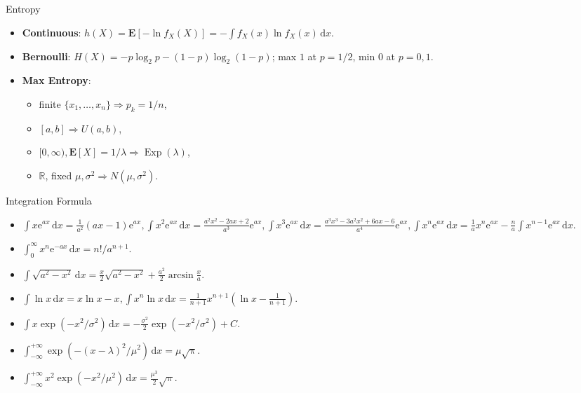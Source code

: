 \documentclass[landscape,a4paper]{article}
\newcommand{\e}{\mathrm{e}}
\newcommand{\EE}{\mathbf{E}}
\begin{document}
\begin{multicols*}{4}
\begin{card}{Entropy}
\begin{itemize}
				\item \textbf{Continuous}: $h(X)=\EE[-\ln f_X(X)]=-\int f_X(x)\ln f_X(x)\,\mathrm dx$.
				\item \textbf{Bernoulli}: $H(X)=-p\log_2p-(1-p)\log_2(1-p)$; max $1$ at $p=1/2$, min $0$ at $p=0,1$.
				\item \textbf{Max Entropy}:
				\begin{itemize}
					\item finite $\{x_1,\dots,x_n\}\Rightarrow p_k=1/n$,
					\item $[a,b]\Rightarrow U(a,b)$,
					\item $[0,\infty),\EE[X]=1/\lambda\Rightarrow \operatorname{Exp}(\lambda)$,
					\item $\mathbb R$, fixed $\mu,\sigma^2\Rightarrow N(\mu,\sigma^2)$.
				\end{itemize}
			\end{itemize}
		\end{card}
		\begin{card}{Integration Formula}
			\begin{itemize}
				\item $\int x\e^{ax}\,\mathrm dx=\frac{1}{a^2}(ax-1)\e^{ax},\int x^2\e^{ax}\,\mathrm dx=\frac{a^2x^2-2ax+2}{a^3}\e^{ax},\int x^3\e^{ax}\,\mathrm dx=\frac{a^3x^3-3a^2x^2+6ax-6}{a^4}\e^{ax},\int x^n\e^{ax}\,\mathrm dx=\frac{1}{a}x^n\e^{ax}-\frac{n}{a}\int x^{n-1}\e^{ax}\,\mathrm dx.$
				\item $\int_0^{\infty}x^n\e^{-ax}\,\mathrm dx=n!/a^{n+1}.$
				\item $\int\sqrt{a^2-x^2}\,\mathrm dx=\frac{x}{2}\sqrt{a^2-x^2}+\frac{a^2}{2}\arcsin\frac{x}{a}.$
				\item $\int \ln x\,\mathrm dx=x\ln x-x,\int x^n\ln x\,\mathrm dx=\frac{1}{n+1}x^{n+1}\left(\ln x-\frac{1}{n+1}\right).$
				\item $\int x\exp\left(-x^2/\sigma^2\right)\,\mathrm dx=-\frac{\sigma^2}{2}\exp\left(-x^2/\sigma^2\right)+C.$
				\item $\int_{-\infty}^{+\infty} \exp\left(-(x-\lambda)^2/\mu^2\right)\,\mathrm dx=\mu\sqrt{\uppi}$.
				\item $\int_{-\infty}^{+\infty}x^2\exp\left(-x^2/\mu^2\right)\,\mathrm dx=\frac{\mu^3}{2}\sqrt{\uppi}.$
			\end{itemize}
		\end{card}
	\end{multicols*}
\end{document}
